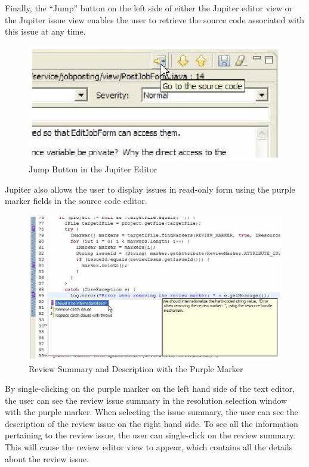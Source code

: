 Finally, the ``Jump'' button on the left side of either the Jupiter editor view or the Jupiter issue view enables the user to retrieve the source code associated with this issue at any time. 

\begin{figure}[htbp]
  \centering
  \includegraphics{images/fig3-31.eps}
  \caption{Jump Button in the Jupiter Editor}
  \label{fig3-31}
\end{figure}

Jupiter also allows the user to display issues in read-only form using the purple marker fields in the source code editor. 

\begin{figure}[htbp]
  \centering
  \includegraphics{images/fig3-32.eps}
  \caption{Review Summary and Description with the Purple Marker}
  \label{fig3-32}
\end{figure}

By single-clicking on the purple marker on the left hand side of the text editor, the user can see the review issue summary in the resolution selection window with the purple marker. When selecting the issue summary, the user can see the description of the review issue on the right hand side. To see all the information pertaining to the review issue, the user can single-click on the review summary. This will cause the review editor view to appear, which contains all the details about the review issue.


